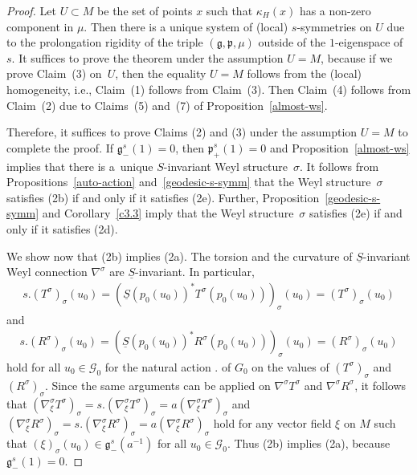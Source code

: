 \documentclass[10pt,a4paper]{amsart}
\newcommand{\si}{\sigma}
\newcommand{\un}{\underline}
\newcommand{\ba}{\mathcal{G}}
\newcommand{\fg}{\mathfrak g}
\newcommand{\fp}{\mathfrak p}
\numberwithin{equation}{section}
\begin{document}
\begin{proof}
Let $U\subset M$ be the set of points $x$ such that $\kappa_H(x)$ has a non-zero component in $\mu$. Then there is a unique system of (local) $s$-symmetries on $U$ due to the prolongation rigidity of the triple $(\fg,\fp,\mu)$ outside of the $1$-eigenspace of~$s$. It suf\/f\/ices to prove the theorem under the assumption $U=M$, because if we prove Claim~(3) on~$U$, then the equality $U=M$ follows from the (local) homogeneity, i.e., Claim~(1) follows from Claim~(3). Then Claim~(4) follows from Claim~(2) due to Claims~(5) and~(7) of Proposition~\ref{almost-ws}.

Therefore, it suf\/f\/ices to prove Claims (2) and (3) under the assumption $U=M$ to complete the proof. If $\fg^s_-(1)=0$, then $\fp^s_+(1)=0$ and Proposition~\ref{almost-ws} implies that there is a~unique $S$-invariant Weyl structu\-re~$\si$. It follows from Propositions~\ref{auto-action} and~\ref{geodesic-s-symm} that the Weyl structure~$\si$ satisf\/ies (2b) if and only if it satisf\/ies (2e). Further, Proposition~\ref{geodesic-s-symm} and Corollary~\ref{c3.3} imply that the Weyl structure~$\si$ satisf\/ies (2e) if and only if it satisf\/ies (2d).

We show now that (2b) implies (2a). The torsion and the curvature of $\un S$-invariant Weyl connection $\nabla^\si$ are $\un S$-invariant. In particular, \begin{gather*}s.(T^\si)_\si(u_0)=(\un S(p_0(u_0))^*T^\si(p_0(u_0)))_\si(u_0)=(T^\si)_\si(u_0)\end{gather*} and \begin{gather*}s.(R^\si)_\si(u_0)=(\un S(p_0(u_0))^*R^\si(p_0(u_0)))_\si(u_0)=(R^\si)_\si(u_0)\end{gather*} hold for all $u_0\in \ba_0$ for the natural action $.$ of $G_0$ on the values of $(T^\si)_\si$ and $(R^\si)_\si$. Since the same arguments can be applied on $\nabla^\si T^\si$ and $\nabla^\si R^\si$, it follows that $(\nabla^\si_\xi T^\si)_\si=s.(\nabla^\si_\xi T^\si)_\si=a(\nabla^\si_\xi T^\si)_\si$ and $(\nabla^\si_\xi R^\si)_\si=s.(\nabla^\si_\xi R^\si)_\si=a(\nabla^\si_\xi R^\si)_\si$ hold for any vector f\/ield $\xi$ on $M$ such that $(\xi)_\si(u_0) \in \fg^s_-(a^{-1})$ for all $u_0\in \ba_0$. Thus (2b) implies (2a), because $\fg^s_-(1)=0$.


\end{proof}
\end{document}
